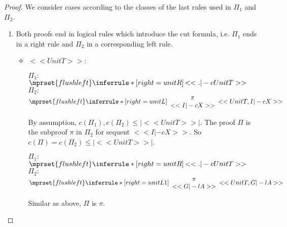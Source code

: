 \begin{proof}
  We consider cases according to the classes of the last rules used in $\Pi_1$ and $\Pi_2$.
  \begin{enumerate}
  \item Both proofs end in logical rules which introduce the cut formula, i.e. $\Pi_1$ ends
        in a right rule and $\Pi_2$ in a corresponding left rule.
    \begin{itemize}
    \item $<<UnitT>>$:
      \begin{center}
        \scriptsize
        $\Pi_1:$
        \begin{math}
          $$\mprset{flushleft}
          \inferrule* [right={\tiny unitR}] {
            \,
          }{<<. |-c UnitT>>}
        \end{math}
        \qquad\qquad
        $\Pi_2:$
        \begin{math}
          $$\mprset{flushleft}
          \inferrule* [right={\tiny unitL}] {
            {
              \begin{array}{c}
                \pi \\
                {<<I |-c X>>}
              \end{array}
            }
          }{<<UnitT, I |-c X>>}
        \end{math}
      \end{center}
      By assumption, $c(\Pi_1),c(\Pi_2)\leq |<<UnitT>>|$. The proof $\Pi$ is the subproof $\pi$
      in $\Pi_2$ for sequent $<<I |-c X>>$. So $c(\Pi)=c(\Pi_2)\leq |<<UnitT>>|$.

      \begin{center}
        \scriptsize
        $\Pi_1:$
        \begin{math}
          $$\mprset{flushleft}
          \inferrule* [right={\tiny unitR}] {
            \,
          }{<<. |-c UnitT>>}
        \end{math}
        \qquad\qquad
        $\Pi_2:$
        \begin{math}
          $$\mprset{flushleft}
          \inferrule* [right={\tiny unitL1}] {
            {
              \begin{array}{c}
                \pi \\
                {<<G |-l A>>}
              \end{array}
            }
          }{<<UnitT, G |-l A>>}
        \end{math}
      \end{center}
      Similar as above, $\Pi$ is $\pi$.


\end{itemize}
\end{enumerate}
\end{proof}
